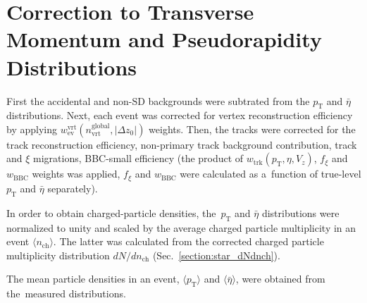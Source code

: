 \section{Correction to Transverse Momentum and Pseudorapidity Distributions}\label{section:star_dNdeta_dNdpt}
First the accidental and non-SD backgrounds were subtrated from the $p_\textrm{T}$ and $\bar{\eta}$ distributions. Next, each event was  corrected for vertex reconstruction efficiency by applying $w_\textrm{ev}^\textrm{vrt}(n_\textrm{vrt}^\textrm{global},|\Delta z_0|)$ weights. Then, the tracks were corrected for the track reconstruction efficiency, non-primary track background contribution, track and $\xi$ migrations, BBC-small efficiency (the product of $w_\textrm{trk}(p_\textrm{T},\eta,V_z)$, $f_\xi$ and $w_\textrm{BBC}$ weights was applied, $f_\xi$ and $w_\textrm{BBC}$ were calculated as a~function of true-level $p_\textrm{T}$ and $\bar{\eta}$ separately). 

In order to obtain charged-particle densities, the~$p_\textrm{T}$ and $\bar{\eta}$ distributions   were normalized to unity and scaled by the average charged particle multiplicity in an event $\langle n_\textrm{ch}\rangle$. The latter was calculated from the corrected charged particle multiplicity distribution $dN/dn_\textrm{ch}$ (Sec.~\ref{section:star_dNdnch}).

 The mean particle densities in an event, $\langle p_\textrm{T}\rangle$ and $\langle \bar{\eta}\rangle$, were obtained from the~measured distributions.